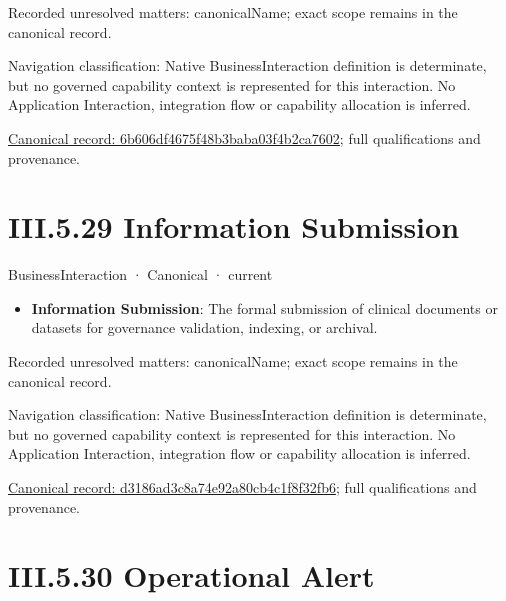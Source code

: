 {\small Recorded unresolved matters: canonicalName; exact scope remains in the canonical record.}\par
{\small Navigation classification: Native BusinessInteraction definition is determinate, but no governed capability context is represented for this interaction. No Application Interaction, integration flow or capability allocation is inferred.}\par
{\footnotesize \href{../../../../../../../../continuum/business/business-interaction/6b606df4675f48b3baba03f4b2ca7602.md}{Canonical record: 6b606df4675f48b3baba03f4b2ca7602}; full qualifications and provenance.}\par
\section*{III.5.29 Information Submission}
\label{navigation:III.5.29}

\label{element:d3186ad3c8a74e92a80cb4c1f8f32fb6}
{\small BusinessInteraction · Canonical · current}\par

\begin{itemize}


\item \textbf{Information Submission}: The formal submission of clinical documents or datasets for governance validation, indexing, or archival.

\end{itemize}

{\small Recorded unresolved matters: canonicalName; exact scope remains in the canonical record.}\par
{\small Navigation classification: Native BusinessInteraction definition is determinate, but no governed capability context is represented for this interaction. No Application Interaction, integration flow or capability allocation is inferred.}\par
{\footnotesize \href{../../../../../../../../continuum/business/business-interaction/d3186ad3c8a74e92a80cb4c1f8f32fb6.md}{Canonical record: d3186ad3c8a74e92a80cb4c1f8f32fb6}; full qualifications and provenance.}\par
\section*{III.5.30 Operational Alert}
\label{navigation:III.5.30}

